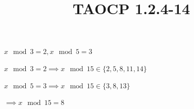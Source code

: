 \documentclass{article}
\title{TAOCP 1.2.4\mbox{-}14}
\begin{document}
\maketitle

\( x \mod 3 = 2, x \mod 5 = 3 \)

\( x \mod 3 = 2 \implies x \mod 15 \in \{ 2, 5, 8, 11, 14 \} \)

\( x \mod 5 = 3 \implies x \mod 15 \in \{ 3, 8, 13 \} \)

\( \implies x \mod 15 = 8 \)
\end{document}
